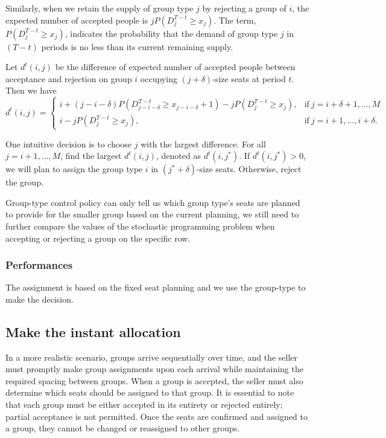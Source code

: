 Similarly, when we retain the supply of group type $j$ by rejecting a group of $i$, the expected number of accepted people is $j P(D_{j}^{T-t} \geq x_{j})$. The term, $P(D_{j}^{T-t} \geq x_{j})$, indicates the probability that the demand of group type $j$ in $(T-t)$ periods is no less than its current remaining supply.

Let $d^{t}(i,j)$ be the difference of expected number of accepted people between acceptance and rejection on group $i$ occupying $(j+\delta)$-size seats at period $t$. Then we have
\begin{equation*}
	d^{t}(i,j) = \begin{cases}
    i + (j-i-\delta)P(D_{j-i-\delta}^{T-t} \geq x_{j-i-\delta}+1) - j P(D_{j}^{T-t} \geq x_{j}), &\text{if}~ j = i+\delta+1, \ldots, M \\
    i - j P(D_{j}^{T-t} \geq x_{j}), &\text{if}~ j = i+1, \ldots, i+\delta.
		\end{cases}
\end{equation*}

One intuitive decision is to choose $j$ with the largest difference. For all $j = i+1, \ldots, M$, find the largest $d^{t}(i,j)$, denoted as $d^{t}(i,j^{*})$. If $d^{t}(i,j^{*}) >0$, we will plan to assign the group type $i$ in $(j^{*}+\delta)$-size seats. Otherwise, reject the group.

Group-type control policy can only tell us which group type's seats are planned to provide for the smaller group based on the current planning, we still need to further compare the values of the stochastic programming problem when accepting or rejecting a group on the specific row. 


\subsubsection{Performances}

The assignment is based on the fixed seat planning and we use the group-type to make the
decision.


\subsection{Make the instant allocation}
In a more realistic scenario, groups arrive sequentially over time, and the seller must promptly make group assignments upon each arrival while maintaining the required spacing between groups. When a group is accepted, the seller must also determine which seats should be assigned to that group. It is essential to note that each group must be either accepted in its entirety or rejected entirely; partial acceptance is not permitted. Once the seats are confirmed and assigned to a group, they cannot be changed or reassigned to other groups.

